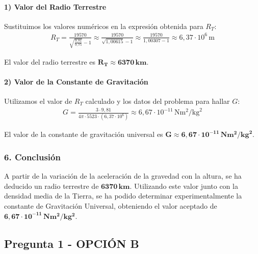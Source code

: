 \paragraph*{1) Valor del Radio Terrestre}
Sustituimos los valores numéricos en la expresión obtenida para $R_T$:
\begin{gather}
    R_T = \frac{19570}{\sqrt{\frac{9,81}{9,75}} - 1} \approx \frac{19570}{\sqrt{1,00615} - 1} \approx \frac{19570}{1,00307 - 1} \approx 6,37 \cdot 10^6 \, \text{m}
\end{gather}
\begin{cajaresultado}
    El valor del radio terrestre es $\boldsymbol{R_T \approx 6370 \, \textbf{km}}$.
\end{cajaresultado}

\paragraph*{2) Valor de la Constante de Gravitación}
Utilizamos el valor de $R_T$ calculado y los datos del problema para hallar $G$:
\begin{gather}
    G = \frac{3 \cdot 9,81}{4\pi \cdot 5523 \cdot (6,37 \cdot 10^6)} \approx 6,67 \cdot 10^{-11} \, \text{N}\text{m}^2/\text{kg}^2
\end{gather}
\begin{cajaresultado}
    El valor de la constante de gravitación universal es $\boldsymbol{G \approx 6,67 \cdot 10^{-11} \, \textbf{N}\textbf{m}^2/\textbf{kg}^2}$.
\end{cajaresultado}

\subsubsection*{6. Conclusión}
\begin{cajaconclusion}
A partir de la variación de la aceleración de la gravedad con la altura, se ha deducido un radio terrestre de $\mathbf{6370 \, km}$. Utilizando este valor junto con la densidad media de la Tierra, se ha podido determinar experimentalmente la constante de Gravitación Universal, obteniendo el valor aceptado de $\mathbf{6,67 \cdot 10^{-11} \, N m^2/kg^2}$.
\end{cajaconclusion}

\newpage

\subsection{Pregunta 1 - OPCIÓN B}
\label{subsec:1B_2002_jun_ord}

